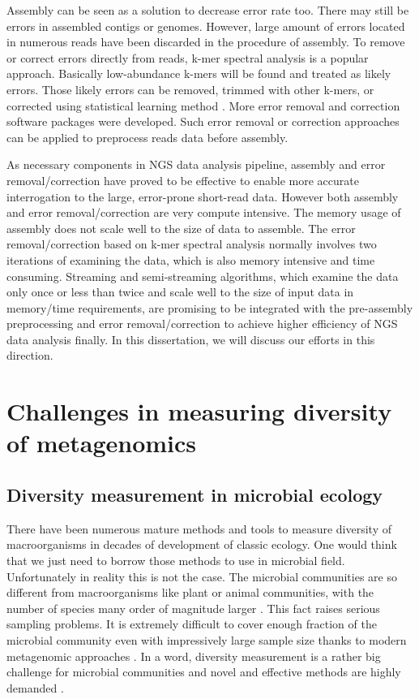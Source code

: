Assembly can be seen as a solution to decrease error rate too. There may still
be errors in assembled contigs or genomes. However, large amount of errors located in 
numerous reads have been discarded in the procedure of assembly. 
To remove or correct errors directly from reads, k-mer spectral analysis is 
a popular approach\cite{Pevzner2001}. Basically low-abundance k-mers will be found and treated as 
likely errors. Those likely errors can be removed, trimmed with other k-mers, 
or corrected using statistical learning method \cite{Kelley2010}. More error
removal and correction software packages were developed\cite{Medvedev2011,pubmed15059830,Kelley2010}.
Such error removal or correction approaches can be applied to preprocess
reads data before assembly.

As necessary components in NGS data analysis pipeline, assembly and error removal/correction
have proved to be effective to enable more accurate interrogation to the large,
error-prone short-read data. However both assembly and error removal/correction are
very compute intensive. The memory usage of assembly does not scale well to the size
of data to assemble. The error removal/correction based on k-mer spectral analysis
normally involves two iterations of examining the data, which is also memory intensive
and time consuming. Streaming and semi-streaming algorithms, which examine the data 
only once or less than twice and scale well to the size of input data in memory/time 
requirements, are promising to be integrated with the pre-assembly preprocessing
and error removal/correction to achieve higher efficiency of NGS data analysis finally.
In this dissertation, we will discuss our efforts in this direction.




\section{Challenges in measuring diversity of metagenomics}


\subsection{Diversity measurement in microbial ecology}

There have been numerous mature methods and tools to measure diversity of
macroorganisms in decades of development of classic ecology. One would think
that we just need to borrow those methods to use in microbial field.
Unfortunately in reality this is not the case. The microbial communities are so
different from macroorganisms like plant or animal communities, with the number
of species many order of magnitude larger \cite{Whitman:1998aa}. This fact
raises serious sampling problems. It is extremely difficult to cover enough
fraction of the microbial community even with impressively large sample size
thanks to modern metagenomic approaches \cite{Roesch:2007aa}. In a word,
diversity measurement is a rather big challenge for microbial communities and
novel and effective methods are highly demanded \cite{Schloss:2005aa}.

